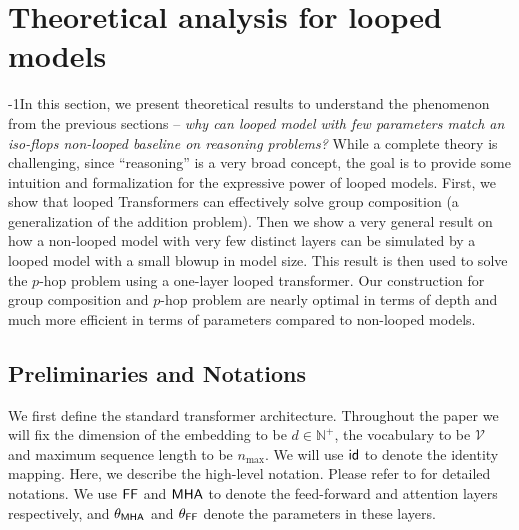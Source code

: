 \vspace{-0.05in}
\section{Theoretical analysis for looped models}
\label{sec:theory}

\vspace{-0.05in}
\looseness-1In this section, we present theoretical results to understand the phenomenon from the previous sections -- {\em why can looped model with few parameters match an iso-flops non-looped baseline on reasoning problems?}
While a complete theory is challenging, since ``reasoning'' is a very broad concept, the goal is to provide some intuition and formalization for the expressive power of looped models. First, we show that looped Transformers can effectively solve group composition (a generalization of the addition problem). Then we show a very general result on how a non-looped model with very few distinct layers can be simulated by a looped model with a small blowup in model size. This result is then used to solve the $p$-hop problem using a one-layer looped transformer. Our construction for group composition and $p$-hop problem are nearly optimal in terms of depth and much more efficient in terms of parameters compared to non-looped models.

\vspace{-0.01in}
\subsection{Preliminaries and Notations}
\label{subsec:prelim}
We first define the standard transformer architecture. Throughout the paper we will fix the dimension of the embedding to be $d\in\mathbb{N}^+$, the vocabulary to be $\mathcal{V}$ and maximum sequence length to be $n_{\max}$. We will use $\mathsf{id}$ to denote the identity mapping. Here, we describe the high-level notation. Please refer to  for detailed notations.
We use $\mathsf{FF}$ and $\mathsf{MHA}$ to denote the feed-forward and attention layers respectively, and $\theta_{\mathsf{MHA}}$ and $\theta_{\mathsf{FF}}$ denote the parameters in these layers.
\vspace{-0.01in}

